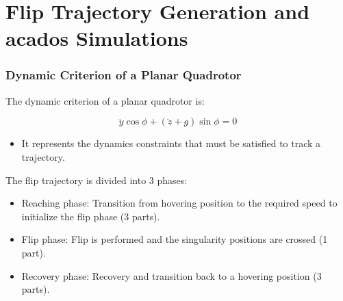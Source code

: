\documentclass{thesisbeamer}
\newcommand\Fontvi{\fontsize{9}{10}\selectfont}
\begin{document}
\section{Flip Trajectory Generation and acados Simulations}

%	
%
%
%
%

\begin{frame}
	\frametitle{Dynamic Criterion of a Planar Quadrotor}
	\Fontvi
	
	The dynamic criterion of a planar quadrotor is\protect\footnotemark:
	
	\begin{equation}\label{dynamics_criterion_equation}
	\ddot{y} \cos \phi + (\ddot{z} + g) \sin \phi = 0
	\end{equation}


	\begin{itemize}
		\item It represents the dynamics constraints that must be satisfied to track a trajectory.
	\end{itemize}

	\vfill	
	
	The flip trajectory is divided into 3 phases:
\begin{itemize}
	\item Reaching phase: Transition from hovering position to the required speed to initialize the flip phase (3 parts).
	\item Flip phase: Flip is performed and the singularity positions are crossed (1 part).
	\item Recovery phase: Recovery and transition back to a hovering position (3 parts).  
\end{itemize}
	

\end{frame}
\end{document}
